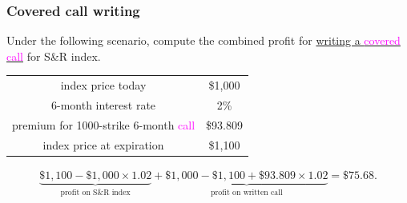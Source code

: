 \begin{frame}[fragile]
\begin{center}
\end{center}
\end{frame}
\begin{frame}[fragile,t]
	\frametitle{Covered call writing}

	\begin{myexample}
		Under the following scenario, compute the combined profit for \underline{writing a
		\textcolor{magenta}{covered call}}
		for S\&R index.
		\begin{center}
			\renewcommand{\arraystretch}{1.2}
			\begin{tabular}{|c|c|}
				\hline
				index price today                                         & \$1,000  \\
				6-month interest rate                                     & 2\%      \\
				premium for 1000-strike 6-month \textcolor{magenta}{call} & \$93.809 \\ \hline
				index price at expiration                                 & \$1,100  \\ \hline
			\end{tabular}
		\end{center}
	\end{myexample}
	\vfill
	\pause
	\begin{mysol}
		\begin{align*}
			\underbrace{\$1,100 - \$1,000 \times 1.02}_{\text{profit on S\&R index}} +
			\underbrace{\$1,000-\$1,100 +\$93.809 \times 1.02}_{\text{profit on written call}} = \$75.68.
		\end{align*}
		\myEnd
	\end{mysol}
\end{frame}
